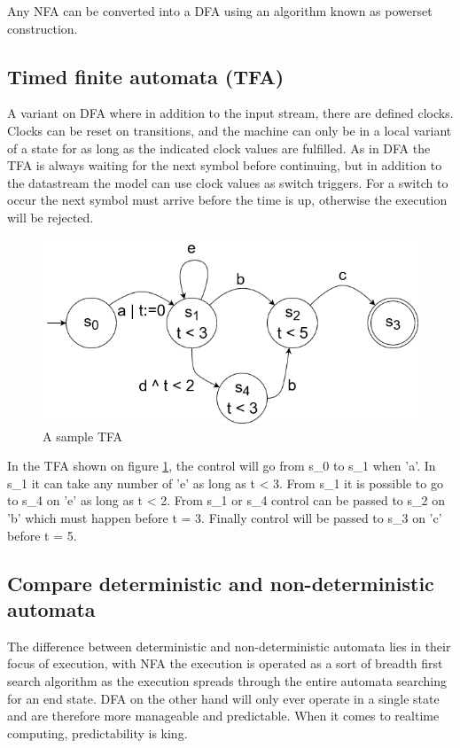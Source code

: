 Any NFA can be converted into a DFA using an algorithm known as powerset construction.

\subsection{Timed finite automata (TFA)}
A variant on DFA where in addition to the input stream, there are defined clocks. Clocks can be reset on transitions, and the machine can only be in a local variant of a state for as long as the indicated clock values are fulfilled. As in DFA the TFA is always waiting for the next symbol before continuing, but in addition to the datastream the model can use clock values as switch triggers. For a switch to occur the next symbol must arrive before the time is up, otherwise the execution will be rejected. 

\begin{figure}[h!]\label{}
    \centering
    \includegraphics[scale=0.5]{realTimeComputing/fig/TFA.png}
    \caption{A sample TFA}
    \label{fig:tfaSample}
\end{figure}

In the TFA shown on figure \ref{fig:tfaSample}, the control will go from s_0 to s_1 when 'a'. In s_1 it can take any number of 'e' as long as t < 3. From s_1 it is possible to go to s_4 on 'e' as long as t < 2. From s_1 or s_4 control can be passed to s_2 on 'b' which must happen before t = 3. Finally control will be passed to s_3 on 'c' before t = 5.

\subsection{Compare deterministic and non-deterministic automata}
The difference between deterministic and non-deterministic automata lies in their focus of execution, with NFA the execution is operated as a sort of breadth first search algorithm as the execution spreads through the entire automata searching for an end state. DFA on the other hand will only ever operate in a single state and are therefore more manageable and predictable. When it comes to realtime computing, predictability is king.

